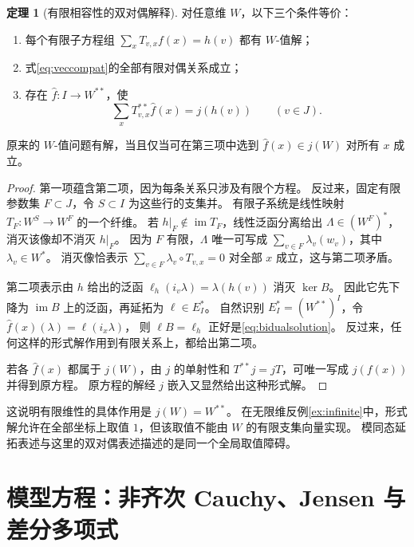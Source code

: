 \documentclass[UTF8,11pt,a4paper]{ctexart}
\theoremstyle{definition}
\newtheorem{theorem}{定理}[section]
\newcommand{\im}{\operatorname{im}}
\begin{document}
\begin{theorem}[有限相容性的双对偶解释]\label{thm:bidual}
对任意维 $W$，以下三个条件等价：
\begin{enumerate}
\item 每个有限子方程组 $\sum_xT_{v,x}f(x)=h(v)$ 都有 $W$-值解；
\item 式\eqref{eq:veccompat}的全部有限对偶关系成立；
\item 存在 $\widehat f:I\to W^{**}$，使
\begin{equation}\label{eq:bidualsolution}
 \sum_xT_{v,x}^{**}\widehat f(x)=j(h(v))\qquad(v\in J).
\end{equation}
\end{enumerate}
原来的 $W$-值问题有解，当且仅当可在第三项中选到 $\widehat f(x)\in j(W)$ 对所有 $x$ 成立。
\end{theorem}
\begin{proof}
第一项蕴含第二项，因为每条关系只涉及有限个方程。
反过来，固定有限参数集 $F\subset J$，令 $S\subset I$ 为这些行的支集并。
有限子系统是线性映射
$T_F:W^S\to W^F$ 的一个纤维。
若 $h|_F\notin\im T_F$，线性泛函分离给出 $\Lambda\in(W^F)^*$，消灭该像却不消灭 $h|_F$。
因为 $F$ 有限，$\Lambda$ 唯一可写成 $\sum_{v\in F}\lambda_v(w_v)$，其中 $\lambda_v\in W^*$。
消灭像恰表示 $\sum_{v\in F}\lambda_v\circ T_{v,x}=0$ 对全部 $x$ 成立，这与第二项矛盾。

第二项表示由 $h$ 给出的泛函 $\ell_h(i_v\lambda)=\lambda(h(v))$ 消灭 $\ker B$。
因此它先下降为 $\im B$ 上的泛函，再延拓为 $\ell\in E_I^*$。
自然识别 $E_I^*=(W^{**})^I$，令 $\widehat f(x)(\lambda)=\ell(i_x\lambda)$，
则 $\ell B=\ell_h$ 正好是\eqref{eq:bidualsolution}。
反过来，任何这样的形式解作用到有限关系上，都给出第二项。

若各 $\widehat f(x)$ 都属于 $j(W)$，由 $j$ 的单射性和 $T^{**}j=jT$，可唯一写成 $j(f(x))$ 并得到原方程。
原方程的解经 $j$ 嵌入又显然给出这种形式解。
\end{proof}

这说明有限维性的具体作用是 $j(W)=W^{**}$。
在无限维反例\ref{ex:infinite}中，形式解允许在全部坐标上取值 $1$，但该取值不能由 $W$ 的有限支集向量实现。
模同态延拓表述与这里的双对偶表述描述的是同一个全局取值障碍。

\section{模型方程：非齐次 Cauchy、Jensen 与差分多项式}\label{sec:models}
\end{document}
